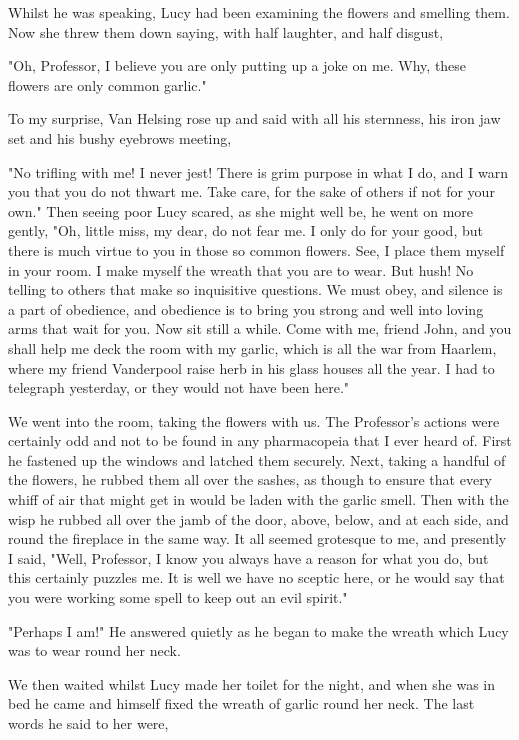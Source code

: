 Whilst he was speaking, Lucy had been examining the flowers and smelling them. Now she threw them down saying, with half laughter, and half disgust, 

"Oh, Professor, I believe you are only putting up a joke on me. Why, these flowers are only common garlic." 

To my surprise, Van Helsing rose up and said with all his sternness, his iron jaw set and his bushy eyebrows meeting, 

"No trifling with me! I never jest! There is grim purpose in what I do, and I warn you that you do not thwart me. Take care, for the sake of others if not for your own." Then seeing poor Lucy scared, as she might well be, he went on more gently, "Oh, little miss, my dear, do not fear me. I only do for your good, but there is much virtue to you in those so common flowers. See, I place them myself in your room. I make myself the wreath that you are to wear. But hush! No telling to others that make so inquisitive questions. We must obey, and silence is a part of obedience, and obedience is to bring you strong and well into loving arms that wait for you. Now sit still a while. Come with me, friend John, and you shall help me deck the room with my garlic, which is all the war from Haarlem, where my friend Vanderpool raise herb in his glass houses all the year. I had to telegraph yesterday, or they would not have been here." 

We went into the room, taking the flowers with us. The Professor's actions were certainly odd and not to be found in any pharmacopeia that I ever heard of. First he fastened up the windows and latched them securely. Next, taking a handful of the flowers, he rubbed them all over the sashes, as though to ensure that every whiff of air that might get in would be laden with the garlic smell. Then with the wisp he rubbed all over the jamb of the door, above, below, and at each side, and round the fireplace in the same way. It all seemed grotesque to me, and presently I said, "Well, Professor, I know you always have a reason for what you do, but this certainly puzzles me. It is well we have no sceptic here, or he would say that you were working some spell to keep out an evil spirit." 

"Perhaps I am!" He answered quietly as he began to make the wreath which Lucy was to wear round her neck. 

We then waited whilst Lucy made her toilet for the night, and when she was in bed he came and himself fixed the wreath of garlic round her neck. The last words he said to her were, 

